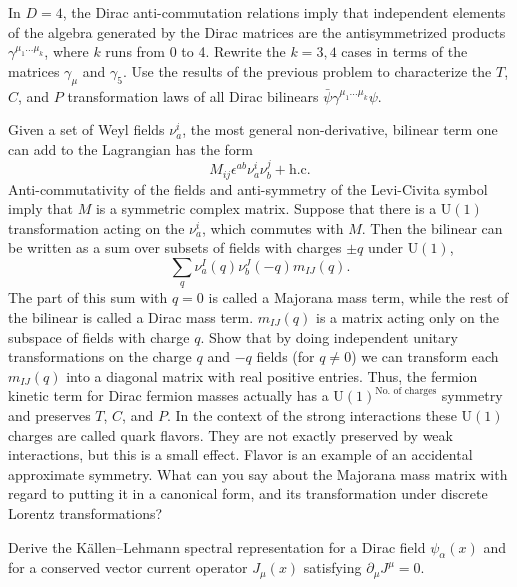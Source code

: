 \begin{banksproblems}
In $D=4$, the Dirac anti-commutation relations imply that independent elements of the algebra generated by the Dirac
matrices are the antisymmetrized products $\gamma^{\mu_1\ldots\mu_k}$, where $k$ runs from 0 to 4. Rewrite the $k=3,4$ cases in terms of the
matrices $\gamma_\mu$ and $\gamma_5$. Use the results of the previous problem to characterize the
$T$, $C$, and $P$ transformation laws of all Dirac bilinears $\bar\psi\gamma^{\mu_1\ldots\mu_k}\psi$.

Given a set of Weyl fields $\nu_a^i$, the most general non-derivative, bilinear term one
can add to the Lagrangian has the form
\begin{equation*}
  M_{ij}\epsilon^{ab}\nu_a^i\nu_b^j+\mathrm{h.c.}
\end{equation*}
Anti-commutativity of the fields and anti-symmetry of the Levi-Civita symbol
imply that $M$ is a symmetric complex matrix. Suppose that there is a $\mathrm{U}(1)$
transformation acting on the $\nu_a^i$, which commutes with $M$. Then the bilinear
can be written as a sum over subsets of fields with charges $\pm q$ under $\mathrm{U}(1)$,
\begin{equation*}
  \sum_q\nu_a^I(q)\nu_b^J(-q)m_{IJ}(q).
\end{equation*}
The part of this sum with $q=0$ is called a Majorana
mass term, while the rest of the bilinear is called a Dirac mass term. $m_{IJ}(q)$
is a matrix acting only on the subspace of fields with charge $q$. Show that by
doing independent unitary transformations on the charge $q$ and $-q$ fields (for
$q\ne0$) we can transform each $m_{IJ}(q)$ into a diagonal matrix with real positive
entries. Thus, the fermion kinetic term for Dirac fermion masses actually has a $\mathrm{U}(1)^{\text{No. of charges}}$
symmetry and preserves $T$, $C$, and $P$. In the context of the strong interactions these $\mathrm{U}(1)$ charges
are called quark flavors. They are not exactly preserved by weak interactions, but this
is a small effect. Flavor is an example of an accidental approximate symmetry. What can you say about the
Majorana mass matrix with regard to putting it in a canonical form, and its
transformation under discrete Lorentz transformations?

Derive the Källen--Lehmann spectral representation for a Dirac field $\psi_\alpha(x)$ and
for a conserved vector current operator $J_\mu(x)$ satisfying $\partial_\mu J^\mu=0$.


\end{banksproblems}
